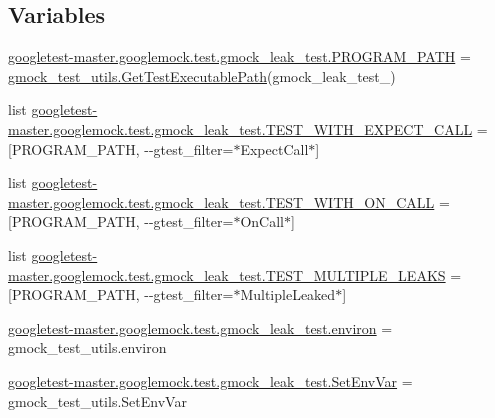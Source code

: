 \subsection*{Variables}
\begin{DoxyCompactItemize}
\item 
\mbox{\hyperlink{namespacegoogletest-master_1_1googlemock_1_1test_1_1gmock__leak__test_acf890d6080bede105120d7731d9edd8f}{googletest-\/master.\+googlemock.\+test.\+gmock\+\_\+leak\+\_\+test.\+P\+R\+O\+G\+R\+A\+M\+\_\+\+P\+A\+TH}} = \mbox{\hyperlink{namespacegmock__test__utils_aadd2927024e24f0c53f7ba283402cdb1}{gmock\+\_\+test\+\_\+utils.\+Get\+Test\+Executable\+Path}}(\textquotesingle{}gmock\+\_\+leak\+\_\+test\+\_\+\textquotesingle{})
\item 
list \mbox{\hyperlink{namespacegoogletest-master_1_1googlemock_1_1test_1_1gmock__leak__test_a4d62187d387c2c6bdb28ffd1dbb47229}{googletest-\/master.\+googlemock.\+test.\+gmock\+\_\+leak\+\_\+test.\+T\+E\+S\+T\+\_\+\+W\+I\+T\+H\+\_\+\+E\+X\+P\+E\+C\+T\+\_\+\+C\+A\+LL}} = \mbox{[}P\+R\+O\+G\+R\+A\+M\+\_\+\+P\+A\+TH, \textquotesingle{}-\/-\/gtest\+\_\+filter=$\ast$Expect\+Call$\ast$\textquotesingle{}\mbox{]}
\item 
list \mbox{\hyperlink{namespacegoogletest-master_1_1googlemock_1_1test_1_1gmock__leak__test_ac8732ca6944d4ef2846924e89bcb227e}{googletest-\/master.\+googlemock.\+test.\+gmock\+\_\+leak\+\_\+test.\+T\+E\+S\+T\+\_\+\+W\+I\+T\+H\+\_\+\+O\+N\+\_\+\+C\+A\+LL}} = \mbox{[}P\+R\+O\+G\+R\+A\+M\+\_\+\+P\+A\+TH, \textquotesingle{}-\/-\/gtest\+\_\+filter=$\ast$On\+Call$\ast$\textquotesingle{}\mbox{]}
\item 
list \mbox{\hyperlink{namespacegoogletest-master_1_1googlemock_1_1test_1_1gmock__leak__test_ab0a35b99a382dfb5b36fdb33e1d731c7}{googletest-\/master.\+googlemock.\+test.\+gmock\+\_\+leak\+\_\+test.\+T\+E\+S\+T\+\_\+\+M\+U\+L\+T\+I\+P\+L\+E\+\_\+\+L\+E\+A\+KS}} = \mbox{[}P\+R\+O\+G\+R\+A\+M\+\_\+\+P\+A\+TH, \textquotesingle{}-\/-\/gtest\+\_\+filter=$\ast$Multiple\+Leaked$\ast$\textquotesingle{}\mbox{]}
\item 
\mbox{\hyperlink{namespacegoogletest-master_1_1googlemock_1_1test_1_1gmock__leak__test_a0f80b6cdceba9a3580989eb38bfd0cb6}{googletest-\/master.\+googlemock.\+test.\+gmock\+\_\+leak\+\_\+test.\+environ}} = gmock\+\_\+test\+\_\+utils.\+environ
\item 
\mbox{\hyperlink{namespacegoogletest-master_1_1googlemock_1_1test_1_1gmock__leak__test_a976dd70a04845ce57a18c33512d2c1d8}{googletest-\/master.\+googlemock.\+test.\+gmock\+\_\+leak\+\_\+test.\+Set\+Env\+Var}} = gmock\+\_\+test\+\_\+utils.\+Set\+Env\+Var
\end{DoxyCompactItemize}

